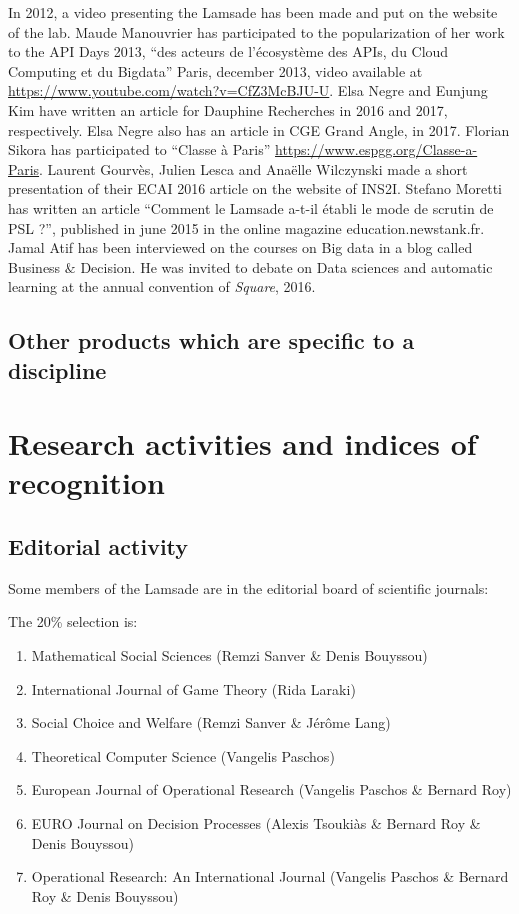 \documentclass[version=last, pagesize, twoside=semi, DIV=calc, 12pt, a4paper, french, english, bibliography=totoc]{scrartcl}
\begin{document}
In 2012, a video presenting the Lamsade has been made and put on the website of the lab.  Maude Manouvrier has participated to the popularization of her work to the  API Days 2013, ``des acteurs de l'\'ecosyst\`eme des APIs, du Cloud Computing et du Bigdata''  Paris, december 2013, video available at \url{https://www.youtube.com/watch?v=CfZ3McBJU-U}. 
Elsa Negre and Eunjung Kim have written an article for Dauphine Recherches in 2016 and 2017, respectively.  Elsa Negre  also has an article in CGE Grand Angle, in 2017. 
Florian Sikora has participated to ``Classe \`a Paris'' \url{https://www.espgg.org/Classe-a-Paris}.  
Laurent Gourv\`es, Julien Lesca and Ana\"elle Wilczynski made a short presentation of their ECAI 2016 article on the website of INS2I.  Stefano Moretti has written an article ``Comment le Lamsade a-t-il \'etabli le mode de
scrutin de PSL ?'', published in june 2015 in the online magazine education.newstank.fr.
Jamal Atif has been interviewed on the courses on Big data in a blog called  Business $\&$ Decision. He was invited to debate on Data sciences and automatic learning at the annual convention of {\em Square}, 2016. 



\subsection{Other products which are specific to a discipline}

\section{Research activities and indices of recognition}


\subsection{Editorial activity}


Some members of the Lamsade are in the editorial board of scientific journals:

The  20\% selection is: 
\begin{enumerate}
\item Mathematical Social Sciences (Remzi Sanver \& Denis Bouyssou) 
\item International Journal of Game Theory (Rida Laraki)
\item Social Choice and Welfare (Remzi Sanver \& J\'er\^ome Lang) 
\item Theoretical Computer Science (Vangelis Paschos)
\item European Journal of Operational Research  (Vangelis Paschos \& Bernard Roy)
\item EURO Journal on Decision Processes (Alexis Tsouki\`as \& Bernard Roy \& Denis Bouyssou)
\item Operational Research: An International Journal  (Vangelis Paschos \& Bernard Roy \& Denis Bouyssou)
\end{enumerate}
\end{document}
